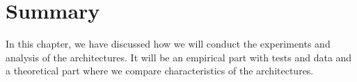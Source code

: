 \section{Summary}
In this chapter, we have discussed how we will conduct the experiments and analysis of the architectures. It will be an empirical part with tests and data and a theoretical part where we compare characteristics of the architectures.



